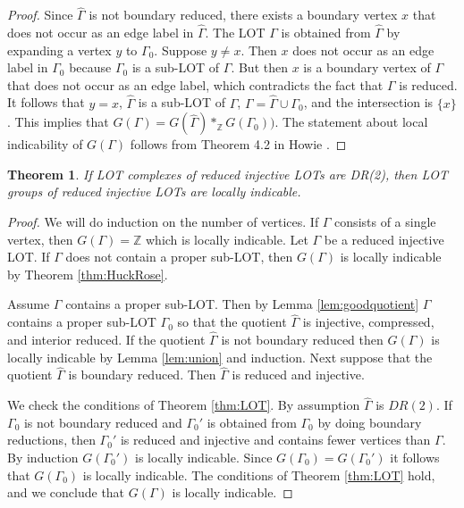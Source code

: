 \documentclass[12pt]{amsart}
\newtheorem{thm}{Theorem}[section]
\theoremstyle{definition}
\begin{document}
\begin{proof}
    Since $\hat \Gamma$ is not boundary reduced, there exists a boundary vertex $x$ that does not occur as an edge label in $\hat\Gamma$. The LOT $\Gamma$ is obtained from $\hat \Gamma$ by expanding a vertex $y$ to $\Gamma_0$. Suppose $y\ne x$. Then $x$ does not occur as an edge label in $\Gamma_0$ because $\Gamma_0$ is a sub-LOT of $\Gamma$. But then $x$ is a boundary vertex of $\Gamma$ that does not occur as an edge label, which contradicts the fact that $\Gamma$ is reduced. It follows that $y=x$, $\hat \Gamma$ is a sub-LOT of $\Gamma$, $\Gamma=\hat\Gamma\cup \Gamma_0$, and the intersection is $\{ x \}$. This implies that $G(\Gamma)=G(\hat \Gamma)*_{\mathbb Z} G(\Gamma_0))$. The statement about local indicability of $G(\Gamma)$ follows from Theorem 4.2 in Howie \cite{How82}.
\end{proof}

\begin{thm}\label{thm:DR(2)li}
    If LOT complexes of reduced injective LOTs are DR(2), then LOT groups of reduced injective LOTs are locally indicable. 
\end{thm}

\begin{proof}
    We will do induction on the number of vertices. If $\Gamma$ consists of a single vertex, then $G(\Gamma)=\mathbb Z$ which is locally indicable. Let $\Gamma$ be a reduced injective LOT. If $\Gamma$ does not contain a proper sub-LOT, then $G(\Gamma)$ is locally indicable by Theorem \ref{thm:HuckRose}.
    
    Assume $\Gamma$ contains a proper sub-LOT. Then by Lemma \ref{lem:goodquotient} $\Gamma$ contains a proper sub-LOT $\Gamma_0$ so that the quotient $\hat \Gamma$ is injective, compressed, and interior reduced. If the quotient $\hat \Gamma$ is not boundary reduced then $G(\Gamma)$ is locally indicable by Lemma \ref{lem:union} and induction. Next suppose that the quotient $\hat \Gamma$ is boundary reduced. Then $\hat \Gamma$ is reduced and injective.
    
    We check the conditions of Theorem \ref{thm:LOT}. By assumption $\hat \Gamma$ is $DR(2)$. If $\Gamma_0$ is not boundary reduced and  $\Gamma_0'$ is obtained from $\Gamma_0$ by doing boundary reductions, then $\Gamma_0'$ is reduced and injective and contains fewer vertices than $\Gamma$. By induction $G(\Gamma_0')$ is locally indicable. Since $G(\Gamma_0)=G(\Gamma_0')$ it follows that $G(\Gamma_0)$ is locally indicable. The conditions of Theorem \ref{thm:LOT} hold, and we conclude that $G(\Gamma)$ is locally indicable. 
\end{proof}
\end{document}
